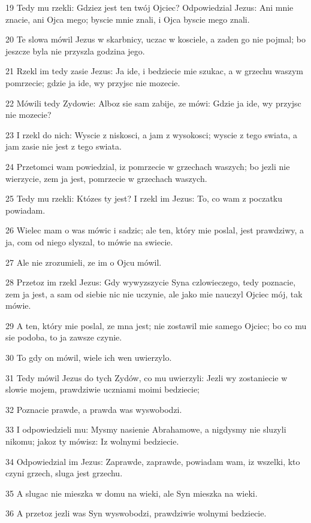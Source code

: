 \par 19 Tedy mu rzekli: Gdziez jest ten twój Ojciec? Odpowiedzial Jezus: Ani mnie znacie, ani Ojca mego; byscie mnie znali, i Ojca byscie mego znali.
\par 20 Te slowa mówil Jezus w skarbnicy, uczac w kosciele, a zaden go nie pojmal; bo jeszcze byla nie przyszla godzina jego.
\par 21 Rzekl im tedy zasie Jezus: Ja ide, i bedziecie mie szukac, a w grzechu waszym pomrzecie; gdzie ja ide, wy przyjsc nie mozecie.
\par 22 Mówili tedy Zydowie: Alboz sie sam zabije, ze mówi: Gdzie ja ide, wy przyjsc nie mozecie?
\par 23 I rzekl do nich: Wyscie z niskosci, a jam z wysokosci; wyscie z tego swiata, a jam zasie nie jest z tego swiata.
\par 24 Przetomci wam powiedzial, iz pomrzecie w grzechach waszych; bo jezli nie wierzycie, zem ja jest, pomrzecie w grzechach waszych.
\par 25 Tedy mu rzekli: Któzes ty jest? I rzekl im Jezus: To, co wam z poczatku powiadam.
\par 26 Wielec mam o was mówic i sadzic; ale ten, który mie poslal, jest prawdziwy, a ja, com od niego slyszal, to mówie na swiecie.
\par 27 Ale nie zrozumieli, ze im o Ojcu mówil.
\par 28 Przetoz im rzekl Jezus: Gdy wywyzszycie Syna czlowieczego, tedy poznacie, zem ja jest, a sam od siebie nic nie uczynie, ale jako mie nauczyl Ojciec mój, tak mówie.
\par 29 A ten, który mie poslal, ze mna jest; nie zostawil mie samego Ojciec; bo co mu sie podoba, to ja zawsze czynie.
\par 30 To gdy on mówil, wiele ich wen uwierzylo.
\par 31 Tedy mówil Jezus do tych Zydów, co mu uwierzyli: Jezli wy zostaniecie w slowie mojem, prawdziwie uczniami moimi bedziecie;
\par 32 Poznacie prawde, a prawda was wyswobodzi.
\par 33 I odpowiedzieli mu: Mysmy nasienie Abrahamowe, a nigdysmy nie sluzyli nikomu; jakoz ty mówisz: Iz wolnymi bedziecie.
\par 34 Odpowiedzial im Jezus: Zaprawde, zaprawde, powiadam wam, iz wszelki, kto czyni grzech, sluga jest grzechu.
\par 35 A slugac nie mieszka w domu na wieki, ale Syn mieszka na wieki.
\par 36 A przetoz jezli was Syn wyswobodzi, prawdziwie wolnymi bedziecie.
